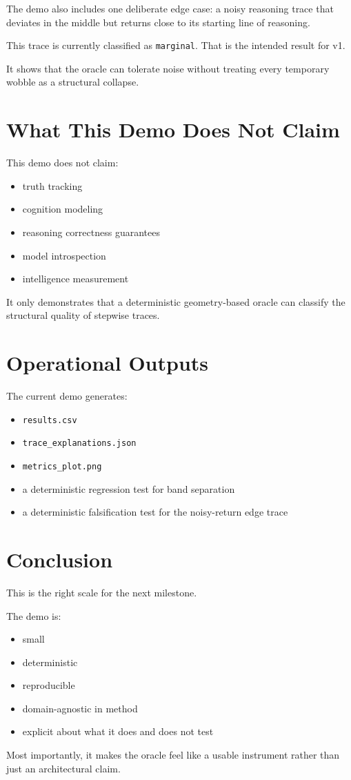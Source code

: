 \documentclass[11pt]{article}
\begin{document}
The demo also includes one deliberate edge case:
a noisy reasoning trace that deviates in the middle but returns close to its starting line of reasoning.

This trace is currently classified as \texttt{marginal}.
That is the intended result for v1.

It shows that the oracle can tolerate noise without treating every temporary wobble as a structural collapse.

\section{What This Demo Does Not Claim}

This demo does not claim:

\begin{itemize}
\item truth tracking
\item cognition modeling
\item reasoning correctness guarantees
\item model introspection
\item intelligence measurement
\end{itemize}

It only demonstrates that a deterministic geometry-based oracle can classify the structural quality of stepwise traces.

\section{Operational Outputs}

The current demo generates:

\begin{itemize}
\item \texttt{results.csv}
\item \texttt{trace\_explanations.json}
\item \texttt{metrics\_plot.png}
\item a deterministic regression test for band separation
\item a deterministic falsification test for the noisy-return edge trace
\end{itemize}

\section{Conclusion}

This is the right scale for the next milestone.

The demo is:

\begin{itemize}
\item small
\item deterministic
\item reproducible
\item domain-agnostic in method
\item explicit about what it does and does not test
\end{itemize}

Most importantly, it makes the oracle feel like a usable instrument rather than just an architectural claim.
\end{document}
